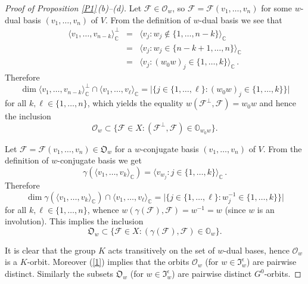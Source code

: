 \documentclass{amsart}
\theoremstyle{definition}
\begin{document}
\begin{proof}[Proof of Proposition \ref{P1}\,{\rm (b)}--{\rm (d)}]
Let $\mathcal{F}\in\mathcal{O}_w$, so
$\mathcal{F}=\mathcal{F}(v_1,\ldots,v_n)$ for some $w$-dual basis
$(v_1,\ldots,v_n)$ of $V$. From the definition of
$w$-dual basis we see that
\begin{eqnarray*}
\langle v_1,\ldots,v_{n-k}\rangle_\mathbb{C}^\perp & = & \langle v_j:w_j\notin\{1,\ldots,n-k\}\rangle_\mathbb{C} \\
 & = & \langle v_j:w_j\in\{n-k+1,\ldots,n\}\rangle_\mathbb{C} \\
 & = & \langle v_j:(w_0w)_j\in\{1,\ldots,k\}\rangle_\mathbb{C}\,.
\end{eqnarray*}
Therefore
\[\dim\langle v_1,\ldots,v_{n-k}\rangle_\mathbb{C}^\perp\cap\langle v_1,\ldots,v_\ell\rangle_\mathbb{C}=\big|\big\{j\in\{1,\ldots,\ell\}:(w_0w)_j\in\{1,\ldots,k\}\big\}\big|\]
for all $k,\ell\in\{1,\ldots,n\}$, which yields the equality
$w(\mathcal{F}^\perp,\mathcal{F})=w_0w$ and hence the inclusion
\begin{equation}
\label{1}
\mathcal{O}_w\subset\{\mathcal{F}\in
X:(\mathcal{F}^\perp,\mathcal{F})\in\mathbb{O}_{w_0w}\}.
\end{equation}

Let $\mathcal{F}=\mathcal{F}(v_1,\ldots,v_n)\in\mathfrak{O}_w$ for a
$w$-conjugate basis $(v_1,\ldots,v_n)$ of $V$. From the
definition of $w$-conjugate basis we get
\[\gamma(\langle v_1,\ldots,v_k\rangle_\mathbb{C})=\langle v_{w_j}:j\in\{1,\ldots,k\}\rangle_\mathbb{C}\,.\]
Therefore
\[\dim\gamma(\langle v_1,\ldots,v_k\rangle_\mathbb{C})\cap\langle v_1,\ldots,v_\ell\rangle_\mathbb{C}=\big|\big\{j\in\{1,\ldots,\ell\}:w^{-1}_j\in\{1,\ldots,k\}\big\}\big|\]
for all $k,\ell\in\{1,\ldots,n\}$, whence
$w(\gamma(\mathcal{F}),\mathcal{F})=w^{-1}=w$ (since $w$ is an
involution). This implies the inclusion
\begin{equation}
\label{2} \mathfrak{O}_w\subset\{\mathcal{F}\in
X:(\gamma(\mathcal{F}),\mathcal{F})\in\mathbb{O}_{w}\}.
\end{equation}

It is clear that the group $K$ acts transitively on the set of
$w$-dual bases, hence $\mathcal{O}_w$ is a $K$-orbit. Moreover
(\ref{1}) implies that the orbits $\mathcal{O}_w$ (for
$w\in\mathfrak{I}_w^\epsilon$) are pairwise distinct. Similarly the
subsets $\mathfrak{O}_w$ (for $w\in\mathfrak{I}_w^\epsilon$) are
pairwise distinct $G^0$-orbits.


\end{proof}
\end{document}
